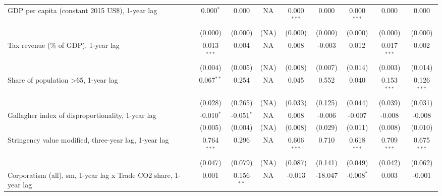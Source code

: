 \begin{table}[htbp]
\begin{tabular}{lcccccccc}
      GDP per capita (constant 2015 US\$), 1-year lag                 & 0.000$^{*}$   & 0.000                     & NA           & 0.000$^{***}$  & 0.000            & 0.000$^{***}$   & 0.000           & 0.000\\   
                                                                      & (0.000)       & (0.000)                   & (NA)         & (0.000)        & (0.000)          & (0.000)         & (0.000)         & (0.000)\\   
      Tax revenue (\% of GDP), 1-year lag                             & 0.013$^{***}$ & 0.004                     & NA           & 0.008          & -0.003           & 0.012           & 0.017$^{***}$   & 0.002\\   
                                                                      & (0.004)       & (0.005)                   & (NA)         & (0.008)        & (0.007)          & (0.014)         & (0.003)         & (0.014)\\   
      Share of population >65, 1-year lag                             & 0.067$^{**}$  & 0.254                     & NA           & 0.045          & 0.552            & 0.040           & 0.153$^{***}$   & 0.126$^{***}$\\   
                                                                      & (0.028)       & (0.265)                   & (NA)         & (0.033)        & (0.125)          & (0.044)         & (0.039)         & (0.031)\\   
      Gallagher index of disproportionality, 1-year lag               & -0.010$^{*}$  & -0.051$^{*}$              & NA           & 0.008          & -0.006           & -0.007          & -0.008          & -0.008\\   
                                                                      & (0.005)       & (0.004)                   & (NA)         & (0.008)        & (0.029)          & (0.011)         & (0.008)         & (0.010)\\   
      Stringency value modified, three-year lag, 1-year lag           & 0.764$^{***}$ & 0.296                     & NA           & 0.606$^{***}$  & 0.710            & 0.618$^{***}$   & 0.709$^{***}$   & 0.675$^{***}$\\   
                                                                      & (0.047)       & (0.079)                   & (NA)         & (0.087)        & (0.141)          & (0.049)         & (0.042)         & (0.062)\\   
      Corporatism (all), sm, 1-year lag x Trade CO2 share, 1-year lag & 0.001         & 0.156$^{**}$              & NA           & -0.013         & -18.047          & -0.008$^{*}$    & 0.003           & -0.001\\   

\end{tabular}
\end{table}
